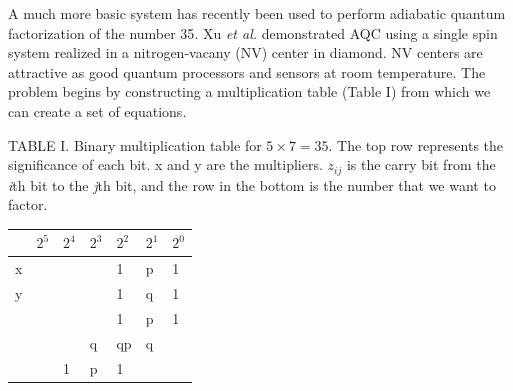 \documentclass[%
 reprint,
 amsmath,amssymb,
 aps,
]{revtex4-1}
\begin{document}
   A much more basic system has recently been used to perform adiabatic quantum factorization of the number 35\cite{Xu2017}. Xu \textit{et al.} demonstrated AQC using a single spin system realized in a nitrogen-vacany (NV) center in diamond. NV centers are attractive as good quantum processors and sensors at room temperature\cite{DOHERTY20131}. The problem begins by constructing a multiplication table (Table I) from which we can create a set of equations.
   

\begin{flushleft}
TABLE I. Binary multiplication table for $ 5 \times 7 = 35 $. The top row represents the significance of each bit. x and y are the multipliers. $z_{ij}$ is the carry bit from the \textit{i}th bit to the \textit{j}th bit, and the row in the bottom is the number that we want to factor\cite{Xu2017}.
\begin{tabular}{ p{1.7cm}  p{1cm} p{1cm} p{1cm} p{1cm} p{1cm} p{1cm}} \hline\hline
 & \textit{$2^5$}  & \textit{$2^4$}  & \textit{$2^3$}
& \textit{$2^2$}   & \textit{$2^1$} & \textit{$2^0$} \\ \hline

x &\hspace{0.1cm} &\hspace{0.1cm} &\hspace{0.1cm} &1 &p &1 \\ 

y &\hspace{0.1cm} &\hspace{0.1cm} &\hspace{0.1cm} &1 &q &1 \\ 

\hspace{0.1cm} &\hspace{0.1cm} &\hspace{0.1cm} &\hspace{0.1cm} &1 &p &1 \\ 

\hspace{0.1cm} &\hspace{0.1cm} &\hspace{0.1cm} &q  &qp &q &\hspace{0.1cm} \\ 

\hspace{0.1cm} &\hspace{0.1cm} &1 &p  &1 &\hspace{0.1cm} &\hspace{0.1cm} \\ 


\end{tabular}
\end{flushleft}
\end{document}
